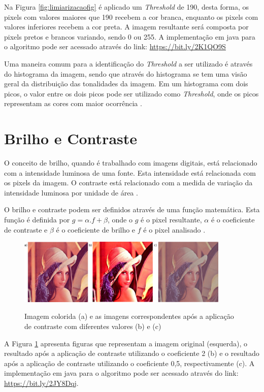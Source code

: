 \documentclass[
	12pt,				%
	oneside,			%
	a4paper,			%
	english,			%
	french,				%
	spanish,			%
	brazil,				%
	]{abntex2}
\begin{document}
Na Figura \ref{fig:limiarizacaofig} é aplicado um \textit{Threshold} de 190, desta forma, os pixels com valores maiores que 190 recebem a cor branca, enquanto os pixels com valores inferiores recebem a cor preta. A imagem resultante será composta por pixels pretos e brancos variando, sendo 0 ou 255. A implementação em java para o algoritmo pode ser acessado através do link: \url{https://bit.ly/2K1QO9S}

Uma maneira comum para a identificação do \textit{Threshold} a ser utilizado é através do histograma da imagem, sendo que através do histograma se tem uma visão geral da distribuição das tonalidades da imagem. Em um histograma com dois picos, o valor entre os dois picos pode ser utilizado como \textit{Threshold}, onde os picos representam as cores com maior ocorrência \cite{gonzalesWoods:2008}. 

\section{Brilho e Contraste}
O conceito de brilho, quando é trabalhado com imagens digitais, está relacionado com a intensidade luminosa de uma fonte. Esta intensidade está relacionada com os pixels da imagem. O contraste está relacionado com a medida de variação da intensidade luminosa por unidade de área \cite{gonzalesWoods:2008}.

O brilho e contraste podem ser definidos através de uma função matemática. Esta função é definida por \(g = \alpha.f + \beta\), onde o \(g\) é o pixel resultante, \(\alpha\) é o coeficiente de contraste e \(\beta\) é o coeficiente de brilho e \(f\) é o pixel analisado \cite{pedriniSchwartz:2008}.

\begin{figure}[ht]
\centering
\caption{Imagem colorida (a) e as imagens correspondentes após a aplicação de contraste com diferentes valores (b) e (c)}
\includegraphics[width=0.9\textwidth]{imagens/contraste.png}
\sourceAuthor
\label{fig:contraste}
\end{figure}

A Figura \ref{fig:contraste} apresenta figuras que representam a imagem original (esquerda), o resultado após a aplicação de contraste utilizando o coeficiente 2 (b) e o resultado após a aplicação de contraste utilizando o coeficiente 0,5, respectivamente (c). A implementação em java para o algoritmo pode ser acessado através do link: \url{https://bit.ly/2JY8Dqj}.
\end{document}
